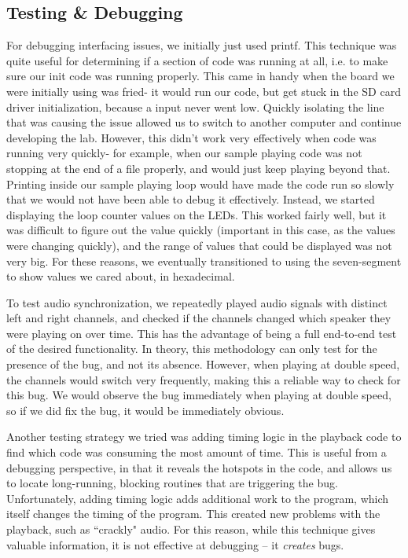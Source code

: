 \documentclass[12pt]{article}
\begin{document}
\subsection{Testing \& Debugging}
For debugging interfacing issues, we initially just used printf.
This technique was quite useful
for determining if a section of code was running at all, i.e. to make sure our
init code was running properly. This came in handy when the board we were
initially using was fried- it would run our code, but get stuck in the SD card
driver initialization, because a input never went low. Quickly isolating the
line that was causing the issue allowed us to switch to another computer and
continue developing the lab. However, this didn't work very effectively when
code was running very quickly- for example, when our sample playing code was
not stopping at the end of a file properly, and would just keep playing
beyond that. Printing inside our sample playing loop would have made the code
run so slowly that we would not have been able to debug it effectively.
Instead, we started displaying the loop counter values on the LEDs. This worked
fairly well, but it was difficult to figure out the value quickly (important
in this case, as the values were changing quickly), and the range of values
that could be displayed was not very big. For these reasons, we eventually
transitioned to using the seven-segment to show values we cared about, in
hexadecimal.

To test audio synchronization, we repeatedly played audio signals with distinct
left and right channels, and checked if the channels changed which speaker they
were playing on over time.
This has the advantage of being a full end-to-end test of the desired
functionality.
In theory, this methodology can only test for the presence of the bug, and not
its absence.
However, when playing at double speed, the channels would switch very frequently,
making this a reliable way to check for this bug.
We would observe the bug immediately when playing at double speed, so if we
did fix the bug, it would be immediately obvious.

Another testing strategy we tried was adding timing logic in the playback code
to find which code was consuming the most amount of time.
This is useful from a debugging perspective, in that it reveals the hotspots in
the code, and allows us to locate long-running, blocking routines that are
triggering the bug.
Unfortunately, adding timing logic adds additional work to the program, which
itself changes the timing of the program.
This created new problems with the playback, such as ``crackly" audio.
For this reason, while this technique gives valuable information, it is not
effective at debugging -- it \emph{creates} bugs.
\end{document}

